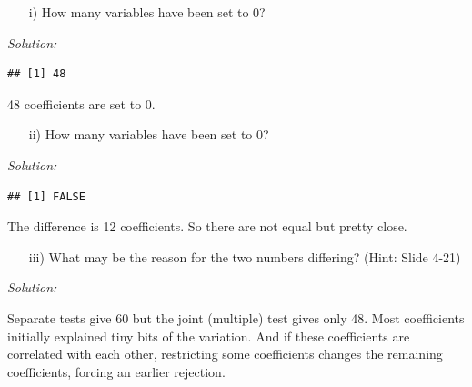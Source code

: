 \documentclass[12pt,a4paper]{article}
\newenvironment{Shaded}{\begin{snugshade}}{\end{snugshade}}
\newcommand{\DecValTok}[1]{\textcolor[rgb]{0.00,0.00,0.81}{#1}}
\newcommand{\FloatTok}[1]{\textcolor[rgb]{0.00,0.00,0.81}{#1}}
\newcommand{\KeywordTok}[1]{\textcolor[rgb]{0.13,0.29,0.53}{\textbf{#1}}}
\newcommand{\NormalTok}[1]{#1}
\newcommand{\OperatorTok}[1]{\textcolor[rgb]{0.81,0.36,0.00}{\textbf{#1}}}
\newcommand{\StringTok}[1]{\textcolor[rgb]{0.31,0.60,0.02}{#1}}
\begin{document}
\begin{itemize}
  \item[i)] How many variables have been set to 0?
\end{itemize}

\emph{Solution:}

\begin{Shaded}
\end{Shaded}

\begin{verbatim}
## [1] 48
\end{verbatim}

48 coefficients are set to 0.

\begin{itemize}
  \item[ii)] How many variables have been set to 0?
\end{itemize}

\emph{Solution:}

\begin{Shaded}
\end{Shaded}

\begin{verbatim}
## [1] FALSE
\end{verbatim}

The difference is 12 coefficients. So there are not equal but pretty
close.

\begin{itemize}
  \item[iii)] What may be the reason for the two numbers differing? (Hint: Slide 4-21)
\end{itemize}

\emph{Solution:}

Separate tests give 60 but the joint (multiple) test gives only 48. Most
coefficients initially explained tiny bits of the variation. And if
these coefficients are correlated with each other, restricting some
coefficients changes the remaining coefficients, forcing an earlier
rejection.
\end{document}
